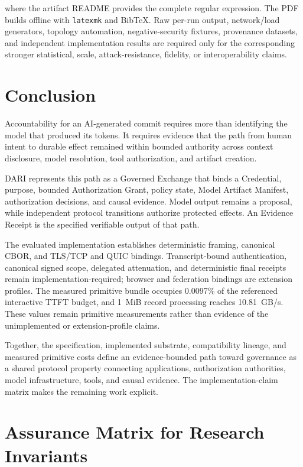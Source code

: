 \documentclass[10pt]{article}
\begin{document}
where the artifact README provides the complete regular expression. The PDF builds offline with \texttt{latexmk} and BibTeX. Raw per-run output, network/load generators, topology automation, negative-security fixtures, provenance datasets, and independent implementation results are required only for the corresponding stronger statistical, scale, attack-resistance, fidelity, or interoperability claims.

\section{Conclusion}

Accountability for an AI-generated commit requires more than identifying the model that produced its tokens. It requires evidence that the path from human intent to durable effect remained within bounded authority across context disclosure, model resolution, tool authorization, and artifact creation.

DARI represents this path as a Governed Exchange that binds a Credential, purpose, bounded Authorization Grant, policy state, Model Artifact Manifest, authorization decisions, and causal evidence. Model output remains a proposal, while independent protocol transitions authorize protected effects. An Evidence Receipt is the specified verifiable output of that path.

The evaluated implementation establishes deterministic framing, canonical CBOR, and TLS/TCP and QUIC bindings. Transcript-bound authentication, canonical signed scope, delegated attenuation, and deterministic final receipts remain implementation-required; browser and federation bindings are extension profiles. The measured primitive bundle occupies 0.0097\% of the referenced interactive TTFT budget, and 1~MiB record processing reaches 10.81~GB/s. These values remain primitive measurements rather than evidence of the unimplemented or extension-profile claims.

Together, the specification, implemented substrate, compatibility lineage, and measured primitive costs define an evidence-bounded path toward governance as a shared protocol property connecting applications, authorization authorities, model infrastructure, tools, and causal evidence. The implementation-claim matrix makes the remaining work explicit.




\clearpage
\onecolumn
\appendix
\section{Assurance Matrix for Research Invariants}
\end{document}
